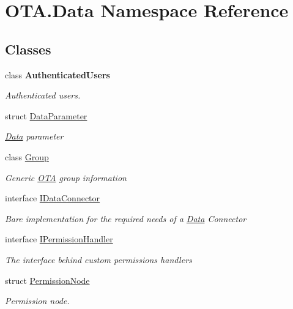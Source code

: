 \hypertarget{namespace_o_t_a_1_1_data}{}\section{O\+T\+A.\+Data Namespace Reference}
\label{namespace_o_t_a_1_1_data}
\subsection*{Classes}
\begin{DoxyCompactItemize}
\item 
class {\bfseries Authenticated\+Users}
\begin{DoxyCompactList}\small\item\em Authenticated users. \end{DoxyCompactList}\item 
struct \hyperlink{struct_o_t_a_1_1_data_1_1_data_parameter}{Data\+Parameter}
\begin{DoxyCompactList}\small\item\em \hyperlink{namespace_o_t_a_1_1_data}{Data} parameter \end{DoxyCompactList}\item 
class \hyperlink{class_o_t_a_1_1_data_1_1_group}{Group}
\begin{DoxyCompactList}\small\item\em Generic \hyperlink{namespace_o_t_a}{O\+T\+A} group information \end{DoxyCompactList}\item 
interface \hyperlink{interface_o_t_a_1_1_data_1_1_i_data_connector}{I\+Data\+Connector}
\begin{DoxyCompactList}\small\item\em Bare implementation for the required needs of a \hyperlink{namespace_o_t_a_1_1_data}{Data} Connector \end{DoxyCompactList}\item 
interface \hyperlink{interface_o_t_a_1_1_data_1_1_i_permission_handler}{I\+Permission\+Handler}
\begin{DoxyCompactList}\small\item\em The interface behind custom permissions handlers \end{DoxyCompactList}\item 
struct \hyperlink{struct_o_t_a_1_1_data_1_1_permission_node}{Permission\+Node}
\begin{DoxyCompactList}\small\item\em Permission node. \end{DoxyCompactList}\item 

\end{DoxyCompactItemize}
